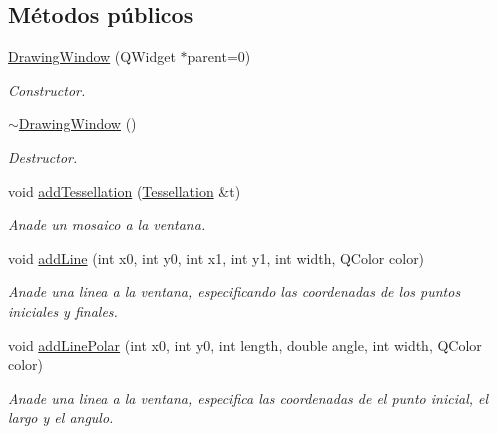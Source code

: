 \subsection*{Métodos públicos}
\begin{DoxyCompactItemize}
\item 
\hypertarget{class_drawing_window_aff3d1b3cbeee8f0e92b49c050d8ca494}{}\hyperlink{class_drawing_window_aff3d1b3cbeee8f0e92b49c050d8ca494}{Drawing\+Window} (Q\+Widget $\ast$parent=0)\label{class_drawing_window_aff3d1b3cbeee8f0e92b49c050d8ca494}

\begin{DoxyCompactList}\small\item\em Constructor. \end{DoxyCompactList}\item 
\hypertarget{class_drawing_window_a0d07890a752adffee1f92a463561dcb6}{}\hyperlink{class_drawing_window_a0d07890a752adffee1f92a463561dcb6}{$\sim$\+Drawing\+Window} ()\label{class_drawing_window_a0d07890a752adffee1f92a463561dcb6}

\begin{DoxyCompactList}\small\item\em Destructor. \end{DoxyCompactList}\item 
void \hyperlink{class_drawing_window_ac5a412fbb239f1f57cabe7a850e1e4fb}{add\+Tessellation} (\hyperlink{class_tessellation}{Tessellation} \&t)
\begin{DoxyCompactList}\small\item\em Anade un mosaico a la ventana. \end{DoxyCompactList}\item 
void \hyperlink{class_drawing_window_a3097e096223530c9f93737441d77422f}{add\+Line} (int x0, int y0, int x1, int y1, int width, Q\+Color color)
\begin{DoxyCompactList}\small\item\em Anade una linea a la ventana, especificando las coordenadas de los puntos iniciales y finales. \end{DoxyCompactList}\item 
void \hyperlink{class_drawing_window_ae03504caa7648347ec56eb58cf5b5db4}{add\+Line\+Polar} (int x0, int y0, int length, double angle, int width, Q\+Color color)
\begin{DoxyCompactList}\small\item\em Anade una linea a la ventana, especifica las coordenadas de el punto inicial, el largo y el angulo. \end{DoxyCompactList}\end{DoxyCompactItemize}
